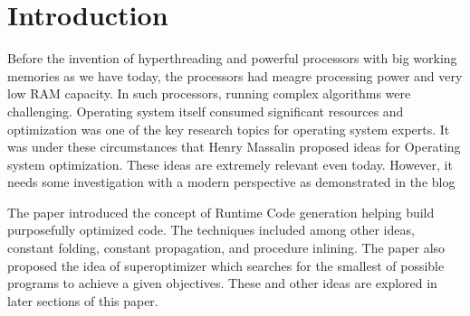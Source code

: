\documentclass[sigconf]{acmart}
\begin{document}


\maketitle

\section{Introduction}
Before the invention of hyperthreading and powerful processors with big working memories as we have today, the processors had meagre processing power and very low RAM capacity. In such processors, running complex algorithms were challenging. Operating system itself consumed significant resources and optimization was one of the key research topics for operating system experts. It was under these circumstances that Henry Massalin proposed ideas for Operating system optimization. These ideas are extremely relevant even today. However, it needs some investigation with a modern perspective as demonstrated in the blog \cite{synthesis2019}

The paper introduced the concept of Runtime Code generation helping build purposefully optimized code. The techniques included among other ideas, constant folding, constant propagation, and procedure inlining. The paper also proposed the idea of superoptimizer which searches for the smallest of possible programs to achieve a given objectives. These and other ideas are explored in later sections of this paper.
\end{document}
